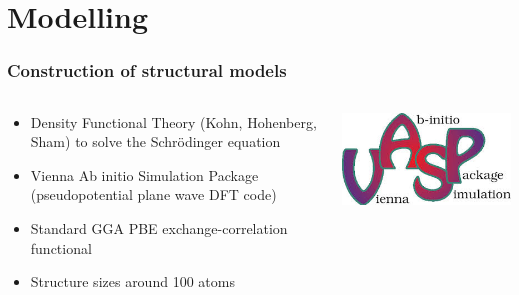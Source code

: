 \documentclass[noamsthm,8pt,t]{beamer}
\begin{document}
\section{Modelling}
\begin{frame}
   \frametitle{Construction of structural models}
   \vspace{-0.3cm}
   \begin{columns}
      \begin{column}{0.8\textwidth}
         \begin{itemize}
            \item Density Functional Theory (Kohn, Hohenberg, Sham) to solve the Schrödinger equation
            \item Vienna Ab initio Simulation Package (pseudopotential plane wave DFT code)
            \item Standard GGA PBE exchange-correlation functional
            \item Structure sizes around 100 atoms
         \end{itemize}
      \end{column}
      \begin{column}{0.2\textwidth}
         \begin{center}
            \includegraphics[width=0.9\linewidth]{figures/VASP.jpg}
         \end{center}
      \end{column}
   \end{columns}

   \pause


\end{frame}
\end{document}
